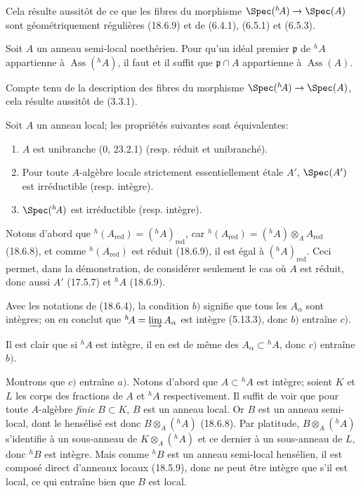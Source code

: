 
Cela résulte aussitôt de ce que les fibres du morphisme $\Spec({}^h\!A)\to\Spec(A)$ sont géométriquement régulières (18.6.9) et de (6.4.1), (6.5.1) et (6.5.3).

\begin{corollary}[18.6.11]
\label{IV.18.6.11}
Soit $A$ un anneau semi-local noethérien. Pour qu'un idéal premier $\mathfrak p$ de ${}^h\!A$ appartienne à $\operatorname{Ass}({}^h\!A)$, il faut et il suffit que $\mathfrak p\cap A$ appartienne à $\operatorname{Ass}(A)$.
\end{corollary}

Compte tenu de la description des fibres du morphisme $\Spec({}^h\!A)\to\Spec(A)$, cela résulte aussitôt de (3.3.1).

\begin{proposition}[18.6.12]
\label{IV.18.6.12}
Soit $A$ un anneau local; les propriétés suivantes sont équivalentes:
\begin{enumerate}
  \item[$a)$] $A$ est unibranche (0, 23.2.1) (resp. réduit et unibranché).
  \item[$b)$] Pour toute $A$-algèbre locale strictement essentiellement étale $A'$, $\Spec(A')$ est irréductible (resp. intègre).
  \item[$c)$] $\Spec({}^h\!A)$ est irréductible (resp. intègre).
\end{enumerate}
\end{proposition}

Notons d'abord que ${}^h(A_{\mathrm{red}})=({}^h\!A)_{\mathrm{red}}$, car ${}^h(A_{\mathrm{red}})=({}^h\!A)\otimes_A A_{\mathrm{red}}$ (18.6.8), et comme ${}^h(A_{\mathrm{red}})$ est réduit (18.6.9), il est égal à $({}^h\!A)_{\mathrm{red}}$. Ceci permet, dans la démonstration, de considérer seulement le cas où $A$ est réduit, donc aussi $A'$ (17.5.7) et ${}^h\!A$ (18.6.9).

Avec les notations de (18.6.4), la condition $b)$ signifie que tous les $A_\alpha$ sont intègres; on en conclut que ${}^h\!A=\varinjlim A_\alpha$ est intègre (5.13.3), donc $b)$ entraîne $c)$.

Il est clair que si ${}^h\!A$ est intègre, il en est de même des $A_\alpha\subset{}^h\!A$, donc $c)$ entraîne $b)$.

Montrons que $c)$ entraîne $a)$. Notons d'abord que $A\subset{}^h\!A$ est intègre; soient $K$ et $L$ les corps des fractions de $A$ et ${}^h\!A$ respectivement. Il suffit de voir que pour toute $A$-algèbre \emph{finie} $B\subset K$, $B$ est un anneau local. Or $B$ est un anneau semi-local, dont le hensélisé est donc $B\otimes_A({}^h\!A)$ (18.6.8). Par platitude, $B\otimes_A({}^h\!A)$ s'identifie à un sous-anneau de $K\otimes_A({}^h\!A)$ et ce dernier à un sous-anneau de $L$, donc ${}^h\!B$ est intègre. Mais comme ${}^h\!B$ est un anneau semi-local hensélien, il est composé direct d'anneaux locaux (18.5.9), donc ne peut être intègre que s'il est local, ce qui entraîne bien que $B$ est local.


